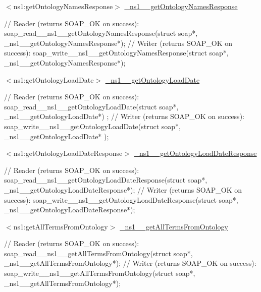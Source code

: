 \begin{DoxyItemize}
\item $<$ns1:getOntologyNamesResponse$>$ \hyperlink{class__ns1____getOntologyNamesResponse}{\_\-ns1\_\-\_\-getOntologyNamesResponse} 
\begin{DoxyCode}
    // Reader (returns SOAP_OK on success):
    soap_read__ns1__getOntologyNamesResponse(struct soap*, 
      _ns1__getOntologyNamesResponse*);
    // Writer (returns SOAP_OK on success):
    soap_write__ns1__getOntologyNamesResponse(struct soap*, 
      _ns1__getOntologyNamesResponse*);
\end{DoxyCode}

\end{DoxyItemize}


\begin{DoxyItemize}
\item $<$ns1:getOntologyLoadDate$>$ \hyperlink{class__ns1____getOntologyLoadDate}{\_\-ns1\_\-\_\-getOntologyLoadDate} 
\begin{DoxyCode}
    // Reader (returns SOAP_OK on success):
    soap_read__ns1__getOntologyLoadDate(struct soap*, _ns1__getOntologyLoadDate*)
      ;
    // Writer (returns SOAP_OK on success):
    soap_write__ns1__getOntologyLoadDate(struct soap*, _ns1__getOntologyLoadDate*
      );
\end{DoxyCode}

\end{DoxyItemize}


\begin{DoxyItemize}
\item $<$ns1:getOntologyLoadDateResponse$>$ \hyperlink{class__ns1____getOntologyLoadDateResponse}{\_\-ns1\_\-\_\-getOntologyLoadDateResponse} 
\begin{DoxyCode}
    // Reader (returns SOAP_OK on success):
    soap_read__ns1__getOntologyLoadDateResponse(struct soap*, 
      _ns1__getOntologyLoadDateResponse*);
    // Writer (returns SOAP_OK on success):
    soap_write__ns1__getOntologyLoadDateResponse(struct soap*, 
      _ns1__getOntologyLoadDateResponse*);
\end{DoxyCode}

\end{DoxyItemize}


\begin{DoxyItemize}
\item $<$ns1:getAllTermsFromOntology$>$ \hyperlink{class__ns1____getAllTermsFromOntology}{\_\-ns1\_\-\_\-getAllTermsFromOntology} 
\begin{DoxyCode}
    // Reader (returns SOAP_OK on success):
    soap_read__ns1__getAllTermsFromOntology(struct soap*, 
      _ns1__getAllTermsFromOntology*);
    // Writer (returns SOAP_OK on success):
    soap_write__ns1__getAllTermsFromOntology(struct soap*, 
      _ns1__getAllTermsFromOntology*);
\end{DoxyCode}

\end{DoxyItemize}


